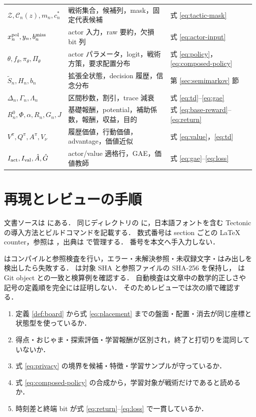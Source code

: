 \begin{longtable}{p{.25\linewidth}p{.43\linewidth}p{.22\linewidth}}
$\mathcal Z,\mathcal C_n(z),m_n,c_n^*$ & 戦術集合，候補列，mask，固定代表候補 & 式 \eqref{eq:tactic-mask}\\
$x_n^{\rm pol},y_n,b_n^{\rm miss}$ & actor 入力，raw 要約，欠損 bit 列 & 式 \eqref{eq:actor-input}\\
$\theta,f_\theta,\pi_\theta,\Pi_\theta$ & actor パラメータ，logit，戦術方策，要求配置分布 & 式 \eqref{eq:policy}，\eqref{eq:composed-policy}\\
$\tilde S_n,H_n,b_n$ & 拡張全状態，decision 履歴，信念分布 & 第 \ref{sec:semimarkov} 節\\
$\Delta_n,\Gamma_n,\Lambda_n$ & 区間秒数，割引，trace 減衰 & 式 \eqref{eq:td}--\eqref{eq:gae}\\
$R_n^0,\Phi,\alpha,R_n,G_n,J$ & 基礎報酬，potential，補助係数，報酬，収益，目的 & 式 \eqref{eq:base-reward}--\eqref{eq:return}\\
$V^\pi,Q^\pi,A^\pi,V_\nu$ & 履歴価値，行動価値，advantage，価値近似 & 式 \eqref{eq:value}，\eqref{eq:td}\\
$I_{\rm act},I_{\rm val},\hat A,\hat G$ & actor/value 適格行，GAE，価値教師 & 式 \eqref{eq:gae}--\eqref{eq:loss}\\\bottomrule
\end{longtable}

\section{再現とレビューの手順}\label{sec:reproduce}
文書ソースは  にある．
同じディレクトリの  に，日本語フォントを含む Tectonic の導入方法とビルドコマンドを記載する．
数式番号は section ごとの LaTeX counter，参照は ，出典は  で管理する．
番号を本文へ手入力しない．

 はコンパイルと参照検査を行い，エラー・未解決参照・未収録文字・はみ出しを検出したら失敗する．
 は対象 SHA と参照ファイルの SHA-256 を保持し，
 は Git object との一致と検算例を確認する．
自動検査は文章中の数学的正しさや記号の定義順を完全には証明しない．
そのためレビューでは次の順で確認する．
\begin{enumerate}
\item 定義 \ref{def:board} から式 \eqref{eq:placement} までの盤面・配置・消去が同じ座標と状態型を使っているか．
\item 得点・おじゃま・探索評価・学習報酬が区別され，終了と打切りを混同していないか．
\item 式 \eqref{eq:privacy} の境界を候補・特徴・学習サンプルが守っているか．
\item 式 \eqref{eq:composed-policy} の合成から，学習対象が戦術だけであると読めるか．
\item 時刻差と終端 bit が式 \eqref{eq:return}--\eqref{eq:loss} で一貫しているか．
\end{enumerate}

